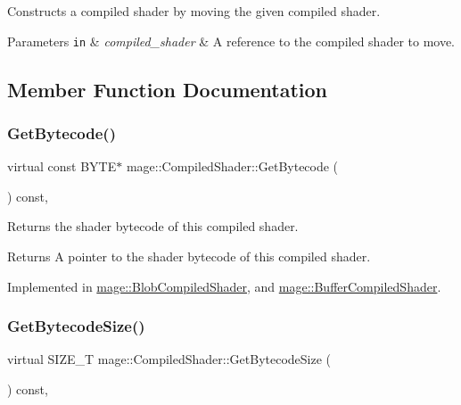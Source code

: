 Constructs a compiled shader by moving the given compiled shader.


\begin{DoxyParams}[1]{Parameters}
\mbox{\tt in}  & {\em compiled\+\_\+shader} & A reference to the compiled shader to move. \\
\hline
\end{DoxyParams}


\subsection{Member Function Documentation}
\hypertarget{structmage_1_1_compiled_shader_a3d7a58d568dc30e66ea7488f28911127}{}\label{structmage_1_1_compiled_shader_a3d7a58d568dc30e66ea7488f28911127} 
\subsubsection{\texorpdfstring{Get\+Bytecode()}{GetBytecode()}}
{\footnotesize\ttfamily virtual const B\+Y\+TE$\ast$ mage\+::\+Compiled\+Shader\+::\+Get\+Bytecode (\begin{DoxyParamCaption}{ }\end{DoxyParamCaption}) const\hspace{0.3cm}{\ttfamily [pure virtual]}, {\ttfamily [noexcept]}}

Returns the shader bytecode of this compiled shader.

\begin{DoxyReturn}{Returns}
A pointer to the shader bytecode of this compiled shader. 
\end{DoxyReturn}


Implemented in \hyperlink{structmage_1_1_blob_compiled_shader_a44cc21b9ab038c57155e64e8ced4d504}{mage\+::\+Blob\+Compiled\+Shader}, and \hyperlink{structmage_1_1_buffer_compiled_shader_ae6b2b4b5c9b96d7ca680724ccf0affb3}{mage\+::\+Buffer\+Compiled\+Shader}.

\hypertarget{structmage_1_1_compiled_shader_ae9dbc3c205d54cc89b9b0746b76b157b}{}\label{structmage_1_1_compiled_shader_ae9dbc3c205d54cc89b9b0746b76b157b} 
\subsubsection{\texorpdfstring{Get\+Bytecode\+Size()}{GetBytecodeSize()}}
{\footnotesize\ttfamily virtual S\+I\+Z\+E\+\_\+T mage\+::\+Compiled\+Shader\+::\+Get\+Bytecode\+Size (\begin{DoxyParamCaption}{ }\end{DoxyParamCaption}) const\hspace{0.3cm}{\ttfamily [pure virtual]}, {\ttfamily [noexcept]}}

